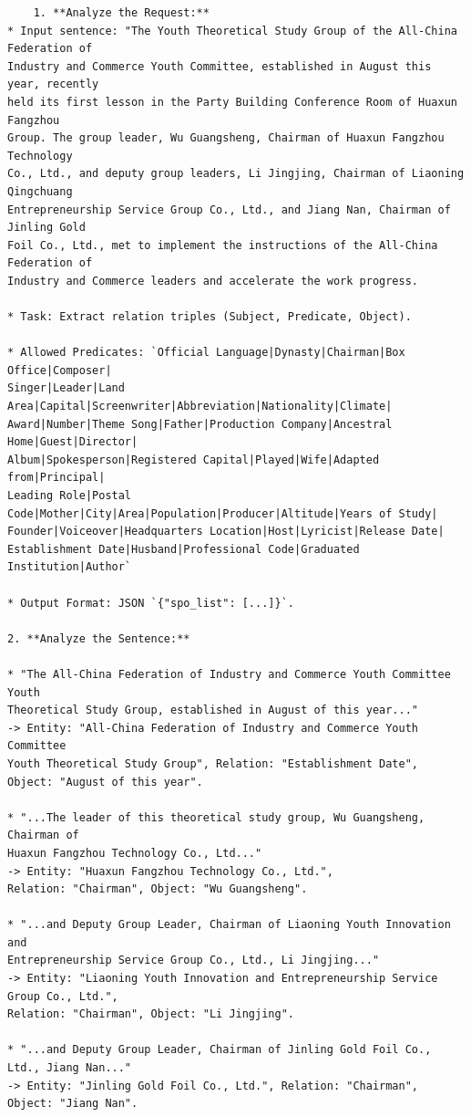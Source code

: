 \begin{verbatim}
    1. **Analyze the Request:**
* Input sentence: "The Youth Theoretical Study Group of the All-China Federation of 
Industry and Commerce Youth Committee, established in August this year, recently 
held its first lesson in the Party Building Conference Room of Huaxun Fangzhou 
Group. The group leader, Wu Guangsheng, Chairman of Huaxun Fangzhou Technology 
Co., Ltd., and deputy group leaders, Li Jingjing, Chairman of Liaoning Qingchuang 
Entrepreneurship Service Group Co., Ltd., and Jiang Nan, Chairman of Jinling Gold 
Foil Co., Ltd., met to implement the instructions of the All-China Federation of 
Industry and Commerce leaders and accelerate the work progress.

* Task: Extract relation triples (Subject, Predicate, Object).

* Allowed Predicates: `Official Language|Dynasty|Chairman|Box Office|Composer|
Singer|Leader|Land Area|Capital|Screenwriter|Abbreviation|Nationality|Climate|
Award|Number|Theme Song|Father|Production Company|Ancestral Home|Guest|Director|
Album|Spokesperson|Registered Capital|Played|Wife|Adapted from|Principal|
Leading Role|Postal Code|Mother|City|Area|Population|Producer|Altitude|Years of Study|
Founder|Voiceover|Headquarters Location|Host|Lyricist|Release Date|
Establishment Date|Husband|Professional Code|Graduated Institution|Author`

* Output Format: JSON `{"spo_list": [...]}`.

2. **Analyze the Sentence:**

* "The All-China Federation of Industry and Commerce Youth Committee Youth 
Theoretical Study Group, established in August of this year..." 
-> Entity: "All-China Federation of Industry and Commerce Youth Committee 
Youth Theoretical Study Group", Relation: "Establishment Date", 
Object: "August of this year".

* "...The leader of this theoretical study group, Wu Guangsheng, Chairman of 
Huaxun Fangzhou Technology Co., Ltd..." 
-> Entity: "Huaxun Fangzhou Technology Co., Ltd.", 
Relation: "Chairman", Object: "Wu Guangsheng".

* "...and Deputy Group Leader, Chairman of Liaoning Youth Innovation and 
Entrepreneurship Service Group Co., Ltd., Li Jingjing..." 
-> Entity: "Liaoning Youth Innovation and Entrepreneurship Service Group Co., Ltd.", 
Relation: "Chairman", Object: "Li Jingjing".

* "...and Deputy Group Leader, Chairman of Jinling Gold Foil Co., Ltd., Jiang Nan..." 
-> Entity: "Jinling Gold Foil Co., Ltd.", Relation: "Chairman", 
Object: "Jiang Nan".


\end{verbatim}
